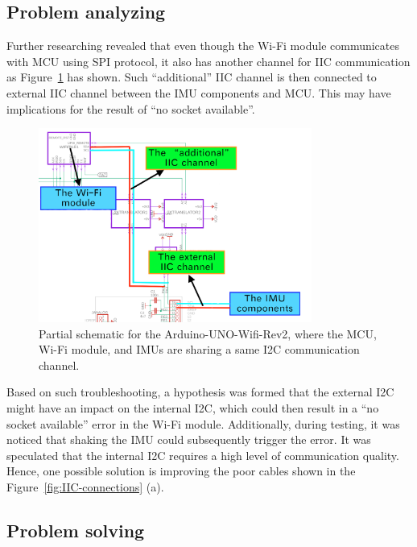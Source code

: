 \subsection{Problem analyzing}
Further researching revealed that even though the Wi-Fi module communicates with MCU using SPI protocol, it also has another channel for IIC communication as Figure~\ref{fig:IIC-conflict} has shown.
Such ``additional'' IIC channel is then connected to external IIC channel between the IMU components and MCU\@.
This may have implications for the result of ``no socket available''.

\begin{figure}[htbp]
	\centering
	\includegraphics[width=0.8\textwidth]{
		fileForWriting/IIC-conflict}
	\caption[Schematic for the Arduino-UNO-Wifi-Rev2]{Partial schematic for the Arduino-UNO-Wifi-Rev2, where the MCU, Wi-Fi module, and IMUs are sharing a same I2C communication channel.
	}
	\label{fig:IIC-conflict}
\end{figure}



Based on such troubleshooting, a hypothesis was formed that the external I2C might have an impact on the internal I2C, which could then result in a ``no socket available'' error in the Wi-Fi module.
Additionally, during testing, it was noticed that shaking the IMU could subsequently trigger the error.
It was speculated that the internal I2C requires a high level of communication quality.
Hence, one possible solution is improving the poor cables shown in the Figure~\ref{fig:IIC-connections} (a).


\subsection{Problem solving}
